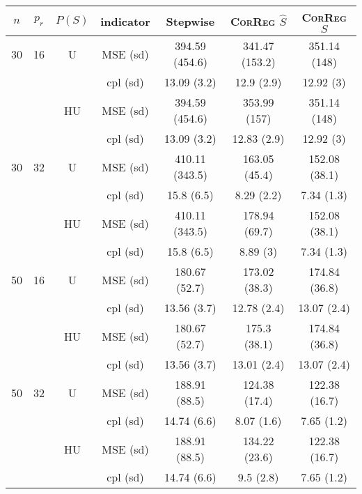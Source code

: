 \documentclass[11pt,a4paper]{article}
\begin{document}
\begin{table}[h!]
\centering
\begin{tabular}{|c|c|c|c|c|c|c|}
\hline 
$n$ & $p_r$&  $P(S)$ &indicator &Stepwise  &    \textsc{CorReg} $\hat S$& \textsc{CorReg} $S$\\ 
\hline %
30 & 16 & U&MSE (sd) & 394.59 (454.6) & 341.47 (153.2) & 351.14 (148) \\
& & & cpl (sd) & 13.09 (3.2) & 12.9 (2.9) & 12.92 (3) \\
 &  &HU &MSE (sd) & 394.59 (454.6) & 353.99 (157) & 351.14 (148) \\
& & & cpl (sd) & 13.09 (3.2) & 12.83 (2.9) & 12.92 (3) \\
\hline %
30 & 32 & U & MSE (sd) & 410.11 (343.5) & 163.05 (45.4) & 152.08 (38.1) \\
& & & cpl (sd) & 15.8 (6.5) & 8.29 (2.2) & 7.34 (1.3) \\
 &  & HU & MSE (sd) & 410.11 (343.5) & 178.94 (69.7) & 152.08 (38.1) \\
& & & cpl (sd) & 15.8 (6.5) & 8.89 (3) & 7.34 (1.3) \\
\hline
\hline %
50 & 16 & U&	MSE (sd) & 180.67 (52.7) & 173.02 (38.3) & 174.84 (36.8) \\
& & & cpl (sd) & 13.56 (3.7) & 12.78 (2.4) & 13.07 (2.4) \\
 &  &HU &MSE (sd) & 180.67 (52.7) & 175.3 (38.1) & 174.84 (36.8) \\
& & & cpl (sd) & 13.56 (3.7) & 13.01 (2.4) & 13.07 (2.4) \\
\hline %
50 & 32 & U&MSE (sd) & 188.91 (88.5) & 124.38 (17.4) & 122.38 (16.7) \\
& & & cpl (sd) & 14.74 (6.6) & 8.07 (1.6) & 7.65 (1.2) \\
 &  &HU &MSE (sd) & 188.91 (88.5) & 134.22 (23.6) & 122.38 (16.7) \\
& & &cpl (sd) & 14.74 (6.6) & 9.5 (2.8) & 7.65 (1.2) \\

\end{tabular}
\end{table}
\end{document}

